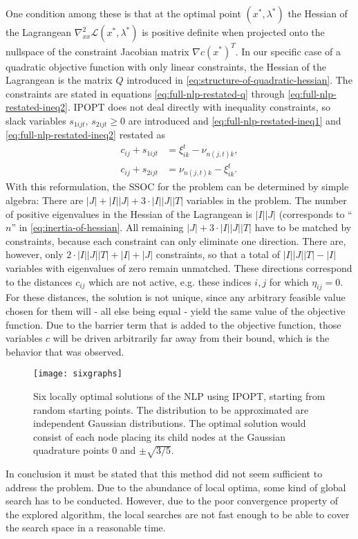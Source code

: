 One condition among these is that at the optimal point $\left(x^*,\lambda^*\right)$ the Hessian of the Lagrangean $\nabla_{xx}^2\mathcal{L}(x^*,\lambda^*)$ is positive definite when projected onto the nullspace of the constraint Jacobian matrix $\nabla c(x^*)^T$. In our specific case of a quadratic objective function with only linear constraints, the Hessian of the Lagrangean is the matrix $Q$ introduced in \eqref{eq:structure-of-quadratic-hessian}. The constraints are stated in equations \eqref{eq:full-nlp-restated-q} through \eqref{eq:full-nlp-restated-ineq2}. IPOPT does not deal directly with inequality constraints, so slack variables $s_{1ijt},\,s_{2ijt} \geq 0$ are introduced and \eqref{eq:full-nlp-restated-ineq1} and \eqref{eq:full-nlp-restated-ineq2} restated as
\begin{subequations}
\begin{align}
  \label{eq:nlp-ineq1-with-slacks}
  c_{ij} +s_{1ijt}&= \xi_{ik}^t - \nu_{n(j,t)k},\\
  c_{ij} +s_{2ijt} &= \nu_{n(j,t)k} - \xi_{ik}^t.
\end{align}
\end{subequations}
With this reformulation, the SSOC for the problem can be determined by simple algebra: There are $|J|+|I||J|+3\cdot|I||J||T|$ variables in the problem. The number of positive eigenvalues in the Hessian of the Lagrangean is $|I||J|$ (corresponds to ``$n$'' in \eqref{eq:inertia-of-hessian}. All remaining $|J|+3\cdot|I||J||T|$ have to be matched by constraints, because each constraint can only eliminate one direction. There are, however, only $2\cdot|I||J||T|+|I|+|J|$ constraints, so that a total of $|I||J||T|-|I|$ variables with eigenvalues of zero remain unmatched. These directions correspond to the distances $c_{ij}$ which are not active, e.g. these indices $i,j$ for which $\eta_{ij}=0$. For these distances, the solution is not unique, since any arbitrary feasible value chosen for them will - all else being equal - yield the same value of the objective function. Due to the barrier term that is added to the objective function, those variables $c$ will be driven arbitrarily far away from their bound, which is the behavior that was observed.
\begin{figure}
  \centering
  \texttt{[image: sixgraphs]}
  \caption{Six locally optimal solutions of the NLP using IPOPT, starting from random starting points. The distribution to be approximated are independent Gaussian distributions. The optimal solution would consist of each node placing its child nodes at the Gaussian quadrature points $0$ and $\pm\sqrt{3/5}$.}
  \label{fig:different-local-minima-with-ipopt}
\end{figure}

In conclusion it must be stated that this method did not seem sufficient to address the problem. Due to the abundance of local optima, some kind of global search has to be conducted. However, due to the poor convergence property of the explored algorithm, the local searches are not fast enough to be able to cover the search space in a reasonable time.
